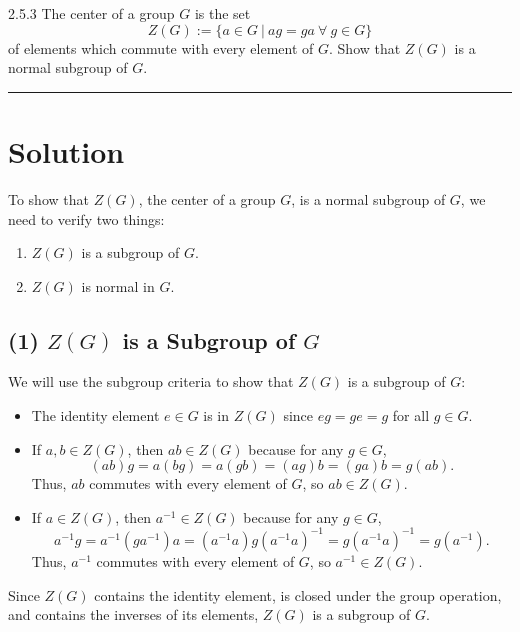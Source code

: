 \documentclass[12pt]{amsart}
\theoremstyle{definition}
\numberwithin{equation}{section}
\begin{document}
\begin{exercise}{2.5.3} The center of a group $G$ is the set \[Z(G) := \{a \in G \ | \ ag = ga \ \forall \ g \in G\}\] of elements which commute with every element of $G$. Show that \(Z(G)\) is a normal subgroup of $G$.

    \noindent\rule{\linewidth}{1pt}
    \section*{Solution}

    To show that \(Z(G)\), the center of a group \(G\), is a normal subgroup of \(G\), we need to verify two things:
    
    \begin{enumerate}
        \item \(Z(G)\) is a subgroup of \(G\).
        \item \(Z(G)\) is normal in \(G\).
    \end{enumerate}
    
    \subsection*{(1) \(Z(G)\) is a Subgroup of \(G\)}
    
    We will use the subgroup criteria to show that \(Z(G)\) is a subgroup of \(G\):
    
    \begin{itemize}
        \item The identity element \(e \in G\) is in \(Z(G)\) since \(eg = ge = g\) for all \(g \in G\).
        \item If \(a, b \in Z(G)\), then \(ab \in Z(G)\) because for any \(g \in G\),
        \[
        (ab)g = a(bg) = a(gb) = (ag)b = (ga)b = g(ab).
        \]
        Thus, \(ab\) commutes with every element of \(G\), so \(ab \in Z(G)\).
        \item If \(a \in Z(G)\), then \(a^{-1} \in Z(G)\) because for any \(g \in G\),
        \[
        a^{-1}g = a^{-1}(ga^{-1})a = (a^{-1}a)g(a^{-1}a)^{-1} = g(a^{-1}a)^{-1} = g(a^{-1}).
        \]
        Thus, \(a^{-1}\) commutes with every element of \(G\), so \(a^{-1} \in Z(G)\).
    \end{itemize}
    
    Since \(Z(G)\) contains the identity element, is closed under the group operation, and contains the inverses of its elements, \(Z(G)\) is a subgroup of \(G\).
    

\end{exercise}
\end{document}
